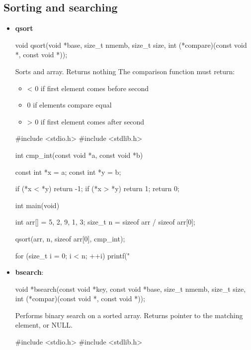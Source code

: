\documentclass{report}
\begin{document}
    \subsection{Sorting and searching}
    \begin{itemize}
        \item \textbf{qsort}
            \bigbreak \noindent 
            \begin{cppcode}
                void qsort(void *base, size_t nmemb, size_t size, int (*compare)(const void *, const void *));
            \end{cppcode}
            \bigbreak \noindent 
            Sorts and array. Returns nothing
            \bigbreak \noindent 
            The comparison function must return:
            \begin{itemize}
                \item < 0   if first element comes before second
                \item 0   if elements compare equal
                \item > 0   if first element comes after second
            \end{itemize}
            \bigbreak \noindent 
            \begin{cppcode}
                #include <stdio.h>
                #include <stdlib.h>

                int cmp_int(const void *a, const void *b) {
                    const int *x = a;
                    const int *y = b;

                    if (*x < *y) return -1;
                    if (*x > *y) return 1;
                    return 0;
                }

                int main(void) {
                    int arr[] = {5, 2, 9, 1, 3};
                    size_t n = sizeof arr / sizeof arr[0];

                    qsort(arr, n, sizeof arr[0], cmp_int);

                    for (size_t i = 0; i < n; ++i) {
                        printf("%
                    }
                }
            \end{cppcode}
        \item \textbf{bsearch}: 
            \begin{cppcode}
                void *bsearch(const void *key, const void *base, size_t nmemb, size_t size, int (*compar)(const void *, const void *));
            \end{cppcode}
            \bigbreak \noindent 
            Performs binary search on a sorted array.
            \bigbreak \noindent 
            Returns pointer to the matching element, or NULL.
            \bigbreak \noindent 
            \begin{cppcode}
                #include <stdio.h>
                #include <stdlib.h>


\end{cppcode}
\end{itemize}
\end{document}
